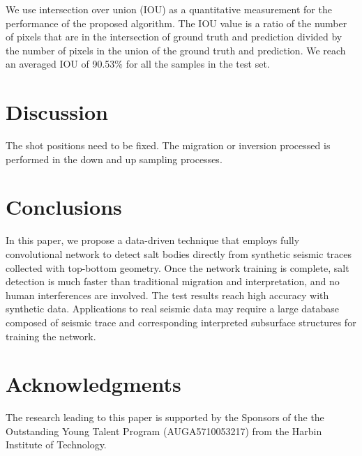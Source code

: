 \documentclass[manuscript,ulem,graphix,revised]{geophysics}
\begin{document}
We use intersection over union (IOU) as a quantitative measurement for the performance of the proposed algorithm. The IOU value is a ratio of the number of pixels that are in the intersection of ground truth and prediction divided by the number of pixels in the union of the ground truth and prediction.
We reach an averaged IOU of 90.53\% for all the samples in the test set.
\section{Discussion}
The shot positions need to be fixed.
The migration or inversion processed is performed in the down and up sampling processes. 


\section{Conclusions}
In this paper, we propose a data-driven technique that employs fully convolutional network to detect salt bodies directly from synthetic seismic traces collected with top-bottom geometry. Once the network training is complete, salt detection is much faster than traditional migration and interpretation, and no human interferences are involved. The test results reach high accuracy with synthetic data. Applications to real seismic data may require a large database composed of seismic trace and corresponding interpreted subsurface structures for training the network.


\section{Acknowledgments}

The research leading to this paper is supported by the Sponsors of the
the Outstanding Young Talent Program (AUGA5710053217) from the Harbin Institute of Technology. 

\newpage


\end{document}
